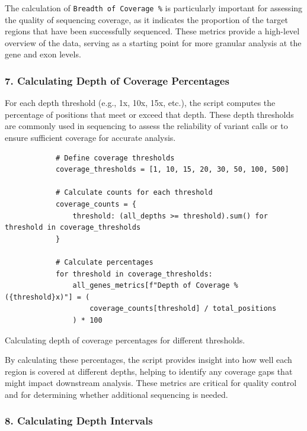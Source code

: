 The calculation of \texttt{Breadth of Coverage \%} is particularly important for assessing the quality of sequencing coverage, as it indicates the proportion of the target regions that have been successfully sequenced. These metrics provide a high-level overview of the data, serving as a starting point for more granular analysis at the gene and exon levels.

\subsubsection{7. Calculating Depth of Coverage Percentages}

For each depth threshold (e.g., 1x, 10x, 15x, etc.), the script computes the percentage of positions that meet or exceed that depth. These depth thresholds are commonly used in sequencing to assess the reliability of variant calls or to ensure sufficient coverage for accurate analysis.

\begin{longlisting}
\begin{verbatim}
            # Define coverage thresholds
            coverage_thresholds = [1, 10, 15, 20, 30, 50, 100, 500]

            # Calculate counts for each threshold
            coverage_counts = {
                threshold: (all_depths >= threshold).sum() for threshold in coverage_thresholds
            }

            # Calculate percentages
            for threshold in coverage_thresholds:
                all_genes_metrics[f"Depth of Coverage % ({threshold}x)"] = (
                    coverage_counts[threshold] / total_positions
                ) * 100
\end{verbatim}
\caption{Calculating depth of coverage percentages for different thresholds.}
\label{lbl:metrics_coverage}
\end{longlisting}

By calculating these percentages, the script provides insight into how well each region is covered at different depths, helping to identify any coverage gaps that might impact downstream analysis. These metrics are critical for quality control and for determining whether additional sequencing is needed.

\subsubsection{8. Calculating Depth Intervals}

